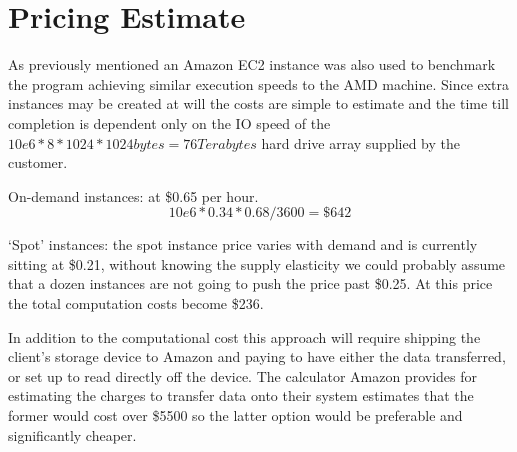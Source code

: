 \documentclass{article}
\begin{document}
\section{Pricing Estimate}
As previously mentioned an Amazon EC2 instance was also used to benchmark the
program achieving similar execution speeds to the AMD machine. Since extra instances
may be created at will the costs are simple to estimate and the time till completion
is dependent only on the IO speed of the $10e6*8*1024*1024bytes = 76Terabytes$ hard
drive array supplied by the customer.

On-demand instances: at \$0.65 per hour.
\[
10e6*0.34*0.68/3600 = \$642
\]

`Spot' instances: the spot instance price varies with demand and is currently sitting
at \$0.21, without knowing the supply elasticity we could probably assume that a dozen
instances are not going to push the price past \$0.25. At this price the total computation
costs become \$236.

In addition to the computational cost this approach will require shipping the client's
storage device to Amazon and paying to have either the data transferred, or set up to
read directly off the device. The calculator Amazon provides for estimating the charges
to transfer data onto their system estimates that the former would cost over \$5500 so
the latter option would be preferable and significantly cheaper.
\end{document}
